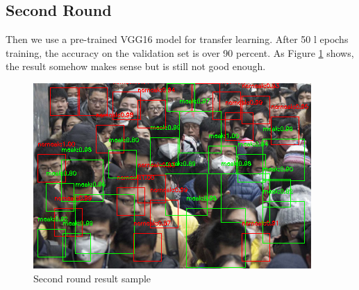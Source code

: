 \documentclass[10pt,a4paper]{report}
\begin{document}
\subsection{Second Round}
Then we use a pre-trained VGG16 model for transfer learning. After 50 l epochs training, the accuracy on the validation set is over 90 percent. As Figure \ref{fig:f2} shows, the result somehow makes sense but is still not good enough.
\begin{figure}[hbtp]

\centering
\includegraphics[scale=1.5]{imgs/r2.png}
\caption{Second round result sample}
        \label{fig:f2}
\end{figure}
\end{document}
